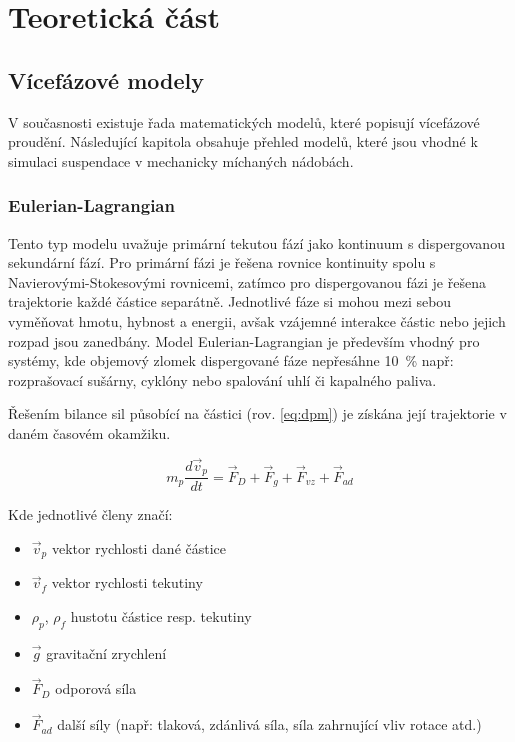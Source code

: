 \chapter{Teoretická část}

\section{Vícefázové modely}
V současnosti existuje řada matematických modelů, které popisují vícefázové proudění. Následující kapitola obsahuje přehled modelů, které jsou vhodné k simulaci suspendace v mechanicky míchaných nádobách.

\subsection{Eulerian-Lagrangian}
Tento typ modelu uvažuje primární tekutou fází jako kontinuum s dispergovanou sekundární fází. Pro primární fázi je řešena rovnice kontinuity spolu s Navierovými-Stokesovými rovnicemi, zatímco pro dispergovanou fázi je řešena trajektorie každé částice separátně. Jednotlivé fáze si mohou mezi sebou vyměňovat hmotu, hybnost a energii, avšak vzájemné interakce částic nebo jejich rozpad jsou zanedbány. Model Eulerian-Lagrangian je především vhodný pro systémy, kde objemový zlomek dispergované fáze nepřesáhne \SI{10}{\percent} např: rozprašovací sušárny, cyklóny nebo spalování uhlí či kapalného paliva. 

Řešením bilance sil působící na částici (rov. \ref{eq:dpm}) je získána její trajektorie v daném časovém okamžiku.

\begin{equation}
	m_{p}\frac{d\vec{v}_{p}}{dt} = \vec{F}_{D} + \vec{F}_{g} + \vec{F}_{vz} + \vec{F}_{ad}
	\label{eq:dpm}
\end{equation} 

\noindent Kde jednotlivé členy značí:

\begin{itemize}[itemsep=0pt,parsep=0pt,partopsep=0pt,topsep=0pt]
  \item $\vec{v}_{p}$ vektor rychlosti dané částice
  \item $\vec{v}_{f}$ vektor rychlosti tekutiny
  \item $\rho_{p}$, $\rho_{f}$ hustotu částice resp. tekutiny
  \item $\vec{g}$ gravitační zrychlení
  \item $\vec{F}_{D}$ odporová síla
  \item $\vec{F}_{ad}$ další síly (např: tlaková, zdánlivá síla, síla zahrnující vliv rotace atd.)
\end{itemize}

